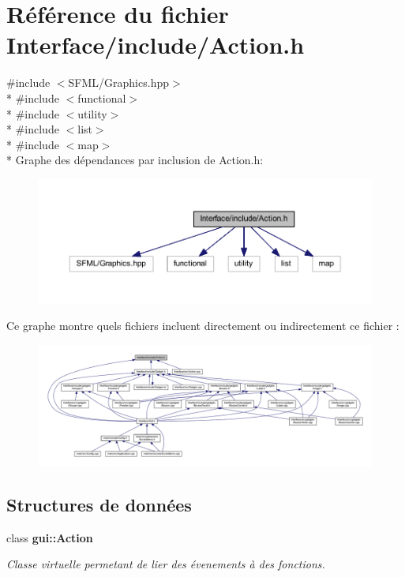 \section{Référence du fichier Interface/include/\+Action.h}
\label{_action_8h}
{\ttfamily \#include $<$S\+F\+M\+L/\+Graphics.\+hpp$>$}\\*
{\ttfamily \#include $<$functional$>$}\\*
{\ttfamily \#include $<$utility$>$}\\*
{\ttfamily \#include $<$list$>$}\\*
{\ttfamily \#include $<$map$>$}\\*
Graphe des dépendances par inclusion de Action.\+h\+:\nopagebreak
\begin{figure}[H]
\begin{center}
\leavevmode
\includegraphics[width=350pt]{_action_8h__incl}
\end{center}
\end{figure}
Ce graphe montre quels fichiers incluent directement ou indirectement ce fichier \+:\nopagebreak
\begin{figure}[H]
\begin{center}
\leavevmode
\includegraphics[width=350pt]{_action_8h__dep__incl}
\end{center}
\end{figure}
\subsection*{Structures de données}
\begin{DoxyCompactItemize}
\item 
class {\bf gui\+::\+Action}
\begin{DoxyCompactList}\small\item\em Classe virtuelle permetant de lier des évenements à des fonctions. \end{DoxyCompactList}\end{DoxyCompactItemize}

